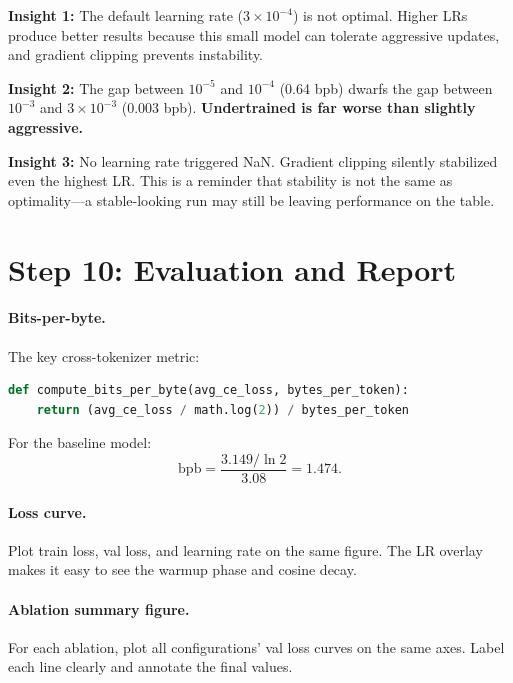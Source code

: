 \textbf{Insight 1:} The default learning rate ($3 \times 10^{-4}$) is not optimal.
Higher LRs produce better results because this small model can tolerate aggressive updates, and gradient clipping prevents instability.

\textbf{Insight 2:} The gap between $10^{-5}$ and $10^{-4}$ (0.64 bpb) dwarfs the gap between $10^{-3}$ and $3 \times 10^{-3}$ (0.003 bpb).
\textbf{Undertrained is far worse than slightly aggressive.}

\textbf{Insight 3:} No learning rate triggered NaN.
Gradient clipping silently stabilized even the highest LR.
This is a reminder that stability is not the same as optimality---a stable-looking run may still be leaving performance on the table.


\section{Step 10: Evaluation and Report}
\label{sec:guide-eval}

\paragraph{Bits-per-byte.}

The key cross-tokenizer metric:

\begin{lstlisting}[language=python, caption={Bits-per-byte computation}]
def compute_bits_per_byte(avg_ce_loss, bytes_per_token):
    return (avg_ce_loss / math.log(2)) / bytes_per_token
\end{lstlisting}

For the baseline model:
\[
\text{bpb}
=
\frac{3.149 / \ln 2}{3.08}
=
1.474 .
\]

\paragraph{Loss curve.}

Plot train loss, val loss, and learning rate on the same figure.
The LR overlay makes it easy to see the warmup phase and cosine decay.

\paragraph{Ablation summary figure.}

For each ablation, plot all configurations' val loss curves on the same axes.
Label each line clearly and annotate the final values.

